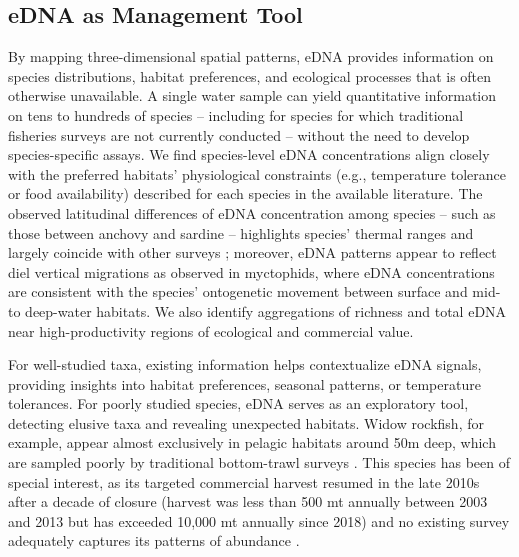 \documentclass{article}
\begin{document}
\subsection*{eDNA as Management Tool}
By mapping three-dimensional spatial patterns, eDNA provides information on species distributions, habitat preferences, and ecological processes that is often otherwise unavailable. A single water sample can yield quantitative information on tens to hundreds of species -- including for species for which traditional fisheries surveys are not currently conducted -- without the need to develop species-specific assays. We find species-level eDNA concentrations align closely with the preferred habitats' physiological constraints (e.g., temperature tolerance or food availability) described for each species in the available literature. The observed latitudinal differences of eDNA concentration among species – such as those between anchovy and sardine – highlights species’ thermal ranges and largely coincide with other surveys \cite{zwolinski2024}; moreover, eDNA patterns appear to reflect diel vertical migrations as observed in myctophids, where eDNA concentrations are consistent with the species’ ontogenetic movement between surface and mid- to deep-water habitats. We also identify aggregations of richness and total eDNA near high-productivity regions of ecological and commercial value. 

For well-studied taxa, existing information helps contextualize eDNA signals, providing insights into habitat preferences, seasonal patterns, or temperature tolerances. For poorly studied species, eDNA serves as an exploratory tool, detecting elusive taxa and revealing unexpected habitats. Widow rockfish, for example, appear almost exclusively in pelagic habitats around 50m deep, which are sampled poorly by traditional bottom-trawl surveys \cite{keller2017}. This species has been of special interest, as its targeted commercial harvest resumed in the late 2010s after a decade of closure (harvest was less than 500 mt annually between 2003 and 2013 but has exceeded 10,000 mt annually since 2018) and no existing survey adequately captures its patterns of abundance \cite{adams2019a}.
\end{document}
